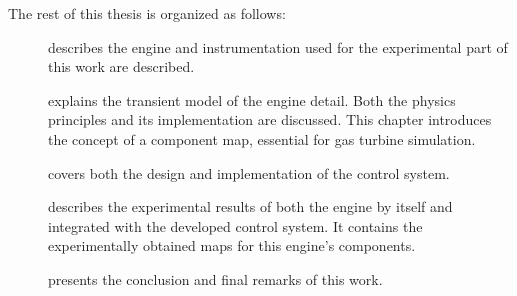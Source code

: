 \documentclass[tcc]{subfiles}
\begin{document}
The rest of this thesis is organized as follows: 
\begin{description}
    \item[] describes the engine and instrumentation used 
         for the experimental part of this work are described.
    \item[] explains the transient model of the engine detail.
        Both the physics principles and its implementation are discussed. 
        This chapter introduces the concept of a component map, 
         essential for gas turbine simulation.
    \item[] covers both the design and implementation of the control system.
    \item[] describes the experimental results of both the engine by itself 
         and integrated with the developed control system. 
        It contains the experimentally obtained maps for this engine's components.
    \item[] presents the conclusion and final remarks of this work.
\end{description}
\end{document}
